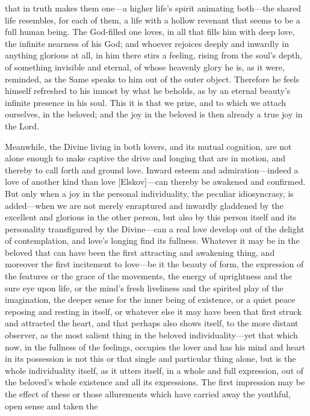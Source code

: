 \documentclass[12pt,a4paper]{book}
\begin{document}
that in truth makes them one---a higher life's spirit animating
both---the shared life resembles, for each of them, a life with a hollow
revenant that seems to be a full human being. The God-filled one loves, in
all that fills him with deep love, the infinite nearness of his God; and
whoever rejoices deeply and inwardly in anything glorious at all, in him
there stirs a feeling, rising from the soul's depth, of something
invisible and eternal, of whose heavenly glory he is, as it were,
reminded, as the Same speaks to him out of the outer object. Therefore he
feels himself refreshed to his inmost by what he beholds, as by an eternal
beauty's infinite presence in his soul. This it is that we prize, and to
which we attach ourselves, in the beloved; and the joy in the beloved is
then already a true joy in the Lord.

Meanwhile, the Divine living in both lovers, and its mutual cognition, are
not alone enough to make captive the drive and longing that are in motion,
and thereby to call forth and ground love. Inward esteem and
admiration---indeed a love of another kind than love [Elskov]---can
thereby be awakened and confirmed. But only when a joy in the personal
individuality, the peculiar idiosyncrasy, is added---when we are not
merely enraptured and inwardly gladdened by the excellent and glorious in
the other person, but also by this person itself and its personality
transfigured by the Divine---can a real love develop out of the delight of
contemplation, and love's longing find its fullness. Whatever it may be in
the beloved that can have been the first attracting and awakening thing,
and moreover the first incitement to love---be it the beauty of form, the
expression of the features or the grace of the movements, the energy of
uprightness and the sure eye upon life, or the mind's fresh liveliness and
the spirited play of the imagination, the deeper sense for the inner being
of existence, or a quiet peace reposing and resting in itself, or whatever
else it may have been that first struck and attracted the heart, and that
perhaps also shows itself, to the more distant observer, as the most
salient thing in the beloved individuality---yet that which now, in the
fullness of the feelings, occupies the lover and has his mind and heart in
its possession is not this or that single and particular thing alone, but
is the whole individuality itself, as it utters itself, in a whole and
full expression, out of the beloved's whole existence and all its
expressions. The first impression may be the effect of these or those
allurements which have carried away the youthful, open sense and taken the
\end{document}

